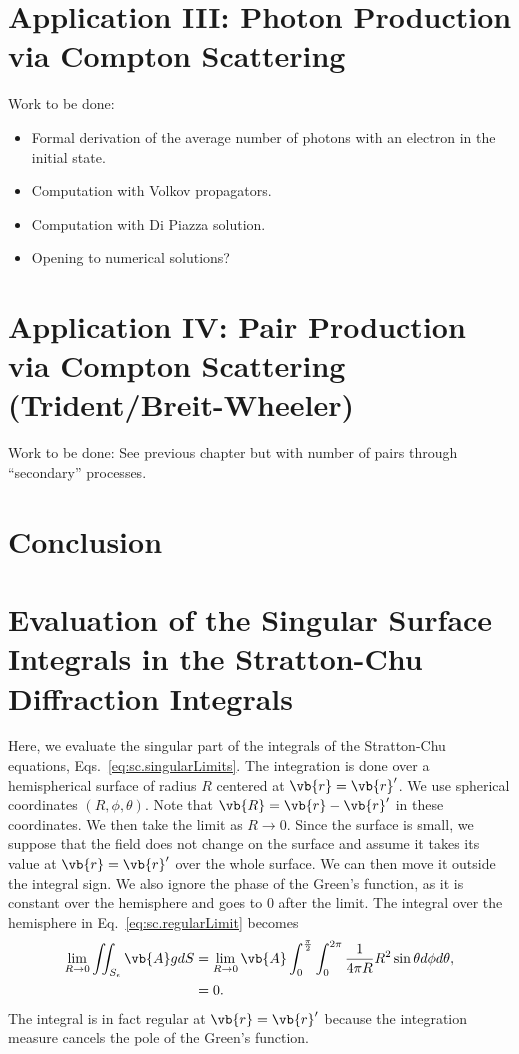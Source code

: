 \documentclass[11pt,SymmetricalJury]{inrsthesis/inrsthesis}
\begin{document}
\chapter{Application III: Photon Production via Compton Scattering}

Work to be done:
  \begin{itemize}
      \item Formal derivation of the average number of photons with an electron
            in the initial state.
      \item Computation with Volkov propagators.
      \item Computation with Di Piazza solution.
      \item Opening to numerical solutions?
\end{itemize}

\chapter{Application IV: Pair Production via Compton Scattering (Trident/Breit-Wheeler)}

Work to be done:
See previous chapter but with number of pairs through ``secondary'' processes.

\chapter{Conclusion}





\appendix

\chapter{Evaluation of the Singular Surface Integrals in the Stratton-Chu Diffraction Integrals}
\label{app.limits}


Here, we evaluate the singular part of the integrals of the Stratton-Chu equations,
Eqs.~\eqref{eq:sc.singularLimits}.
The integration is done over a hemispherical surface of radius $R$ centered at
$\vb{r}=\vb{r}'$. We use spherical coordinates $(R,\phi,\theta)$. Note that
$\vb{R}=\vb{r}-\vb{r}'$ in these coordinates.
We then take the limit as $R\rightarrow0$. Since the surface
is small, we suppose that the field does not change on the surface and assume
it takes its value at $\vb{r}=\vb{r}'$ over the whole surface. We can then move it
outside the integral sign. We also ignore the phase of the Green's function, as
it is constant over the hemisphere and goes to 0 after the limit.
The integral over the hemisphere in Eq.~\eqref{eq:sc.regularLimit} becomes
  \begin{align}
    \lim_{R\rightarrow0}\iint_{S_\epsilon}\vb{A}gdS
      &= \lim_{R\rightarrow0}\vb{A}\int_0^{\frac{\pi}{2}}\int_0^{2\pi}\frac{1}{4\pi R} R^2 \sin\theta d\phi d\theta,\nonumber\\
      &= 0.
  \end{align}
The integral is in fact regular at $\vb{r}=\vb{r}'$ because the integration measure
cancels the pole of the Green's function.
\end{document}
